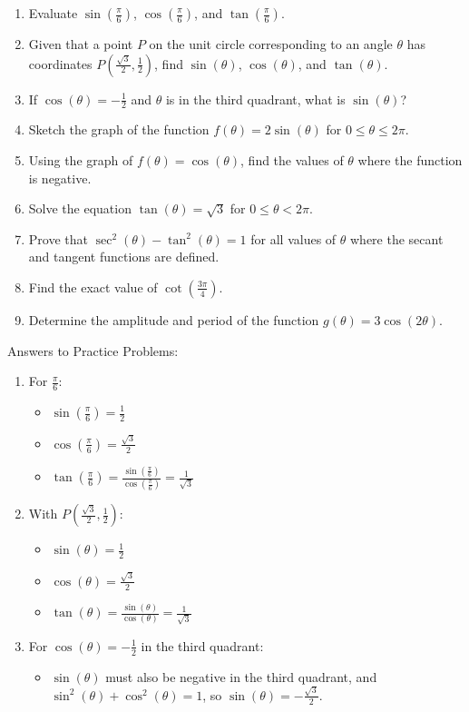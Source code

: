 \documentclass[a4paper,12pt]{book}
\begin{document}
\begin{enumerate}
  \item Evaluate \(\sin\left(\frac{\pi}{6}\right)\), \(\cos\left(\frac{\pi}{6}\right)\), and \(\tan\left(\frac{\pi}{6}\right)\).
  \item Given that a point \( P \) on the unit circle corresponding to an angle \(\theta\) has coordinates \( P(\frac{\sqrt{3}}{2}, \frac{1}{2}) \), find \(\sin(\theta)\), \(\cos(\theta)\), and \(\tan(\theta)\).
  \item If \(\cos(\theta) = -\frac{1}{2}\) and \(\theta\) is in the third quadrant, what is \(\sin(\theta)\)?
  \item Sketch the graph of the function \( f(\theta) = 2\sin(\theta) \) for \( 0 \leq \theta \leq 2\pi \).
  \item Using the graph of \( f(\theta) = \cos(\theta) \), find the values of \(\theta\) where the function is negative.
  \item Solve the equation \( \tan(\theta) = \sqrt{3} \) for \( 0 \leq \theta < 2\pi \).
  \item Prove that \(\sec^2(\theta) - \tan^2(\theta) = 1\) for all values of \(\theta\) where the secant and tangent functions are defined.
  \item Find the exact value of \(\cot\left(\frac{3\pi}{4}\right)\).
  \item Determine the amplitude and period of the function \( g(\theta) = 3\cos(2\theta) \).
\end{enumerate}

Answers to Practice Problems:

\begin{enumerate}
  \item For \(\frac{\pi}{6}\):
    \begin{itemize}
      \item \(\sin\left(\frac{\pi}{6}\right) = \frac{1}{2}\)
      \item \(\cos\left(\frac{\pi}{6}\right) = \frac{\sqrt{3}}{2}\)
      \item \(\tan\left(\frac{\pi}{6}\right) = \frac{\sin\left(\frac{\pi}{6}\right)}{\cos\left(\frac{\pi}{6}\right)} = \frac{1}{\sqrt{3}}\)
    \end{itemize}
  \item With \( P(\frac{\sqrt{3}}{2}, \frac{1}{2}) \):
    \begin{itemize}
      \item \(\sin(\theta) = \frac{1}{2}\)
      \item \(\cos(\theta) = \frac{\sqrt{3}}{2}\)
      \item \(\tan(\theta) = \frac{\sin(\theta)}{\cos(\theta)} = \frac{1}{\sqrt{3}}\)
    \end{itemize}
  \item For \(\cos(\theta) = -\frac{1}{2}\) in the third quadrant:
    \begin{itemize}
      \item \(\sin(\theta)\) must also be negative in the third quadrant, and \(\sin^2(\theta) + \cos^2(\theta) = 1\), so \(\sin(\theta) = -\frac{\sqrt{3}}{2}\).
    \end{itemize}
\end{enumerate}
\end{document}
